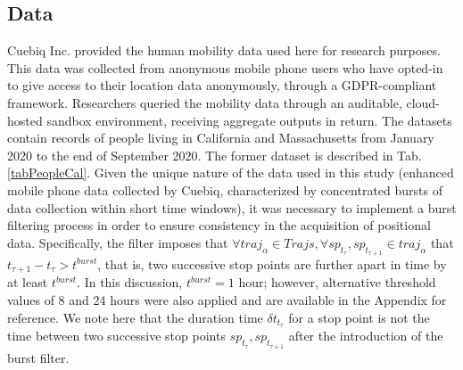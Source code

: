 \documentclass[main.tex]{subfiles}
\begin{document}
\subsection*{Data}
\label{dataset}

Cuebiq Inc. provided the human mobility data used here for research purposes. This data was collected from anonymous mobile phone users who have opted-in to give access to their location data anonymously, through a GDPR-compliant framework. Researchers queried the mobility data through an auditable, cloud-hosted sandbox environment, receiving aggregate outputs in return. The datasets contain records of people living in California and Massachusetts from January 2020 to the end of September 2020. The former dataset is described in Tab.\ref{tabPeopleCal}. Given the unique nature of the data used in this study (enhanced mobile phone data collected by Cuebiq, characterized by concentrated bursts of data collection within short time windows), it was necessary to implement a burst filtering process in order to ensure consistency in the acquisition of positional data. Specifically, the filter imposes that $\forall traj_{\alpha} \in Trajs, \forall sp_{t_{\tau}},sp_{t_{\tau + 1}} \in traj_{\alpha} $ that $t_{\tau + 1} - t_{\tau} > t^{burst}$, that is, two successive stop points are further apart in time by at least $t^{burst}$. In this discussion, $t^{burst} = 1$ hour; however, alternative threshold values of 8 and 24 hours were also applied and are available in the Appendix for reference. We note here that the duration time $\delta t_{t_{\tau}}$ for a stop point is not the time between two successive stop points $sp_{t_{\tau}},sp_{t_{\tau + 1}}$ after the introduction of the burst filter.

\end{document}
